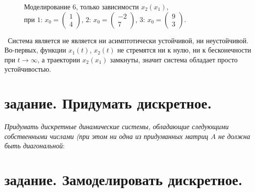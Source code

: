 \documentclass[a5paper, 10pt]{article}
\theoremstyle{definition}
\theoremstyle{plain}
\theoremstyle{remark}
\begin{document}
\begin{figure}[h!]
\caption{Моделирование 6, только зависимости $x_2(x_1)$, \\при  $1: \, x_0 = \begin{pmatrix} 1 \\ 4 \end{pmatrix}$, $2: \, x_0 = \begin{pmatrix} -2 \\ 7 \end{pmatrix}$, $3: \, x_0 = \begin{pmatrix} 9 \\ 3 \end{pmatrix}$.}
\end{figure}

\newpage
\,
\newpage
Система является не является ни асимптотически устойчивой, ни неустойчивой. Во-первых, функции $x_1(t)$, $x_2(t)$ не стремятся ни к нулю, ни к бесконечности при $t \to \infty$, а траектории $x_2(x_1)$ замкнуты, значит система обладает просто устойчивостью.

\newpage
\section{задание. Придумать дискретное.}
\textit{Придумать дискретные динамические системы, обладающие следующими собственными числами (при этом ни одна из придуманных матриц $A$ не должна быть диагональной}:






\newpage
\section{задание. Замоделировать дискретное.}
\end{document}
